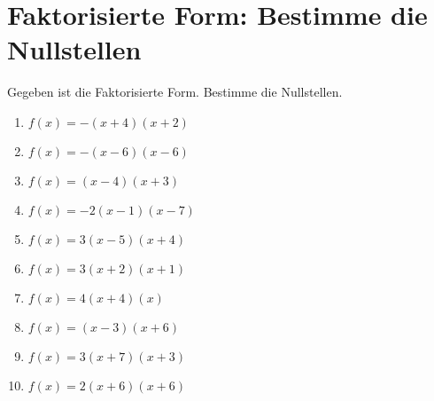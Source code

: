 \documentclass{article}%
\begin{document}
\section{Faktorisierte Form: Bestimme die Nullstellen}%
\label{sec:FaktorisierteFormBestimmedieNullstellen}%
Gegeben ist die Faktorisierte Form. Bestimme die Nullstellen.%
\begin{enumerate}[label=\alph*)]%
\item%
\newline\vspace{0.5cm} $f(x)=-(x+4)(x+2)$%
\item%
\newline\vspace{0.5cm} $f(x)=-(x-6)(x-6)$%
\item%
\newline\vspace{0.5cm} $f(x)=(x-4)(x+3)$%
\item%
\newline\vspace{0.5cm} $f(x)=-2(x-1)(x-7)$%
\item%
\newline\vspace{0.5cm} $f(x)=3(x-5)(x+4)$%
\item%
\newline\vspace{0.5cm} $f(x)=3(x+2)(x+1)$%
\item%
\newline\vspace{0.5cm} $f(x)=4(x+4)(x)$%
\item%
\newline\vspace{0.5cm} $f(x)=(x-3)(x+6)$%
\item%
\newline\vspace{0.5cm} $f(x)=3(x+7)(x+3)$%
\item%
\newline\vspace{0.5cm} $f(x)=2(x+6)(x+6)$%
\end{enumerate}

%
\end{document}
